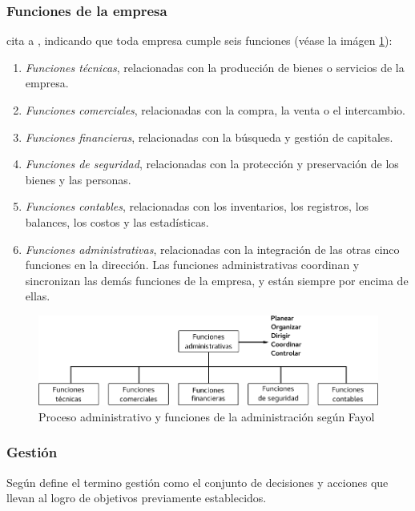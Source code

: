 \subsubsection{Funciones de la empresa}
\cite{chiavenato} cita a \cite{fayol}, indicando que toda empresa cumple seis funciones
(v\'ease la im\'agen \ref{fig:adm}):
\begin{enumerate}
    \item \emph{Funciones t\'ecnicas}, relacionadas con la producci\'on de bienes o
          servicios de la empresa.
    \item \emph{Funciones comerciales}, relacionadas con la compra, la venta o el
          intercambio.
    \item \emph{Funciones financieras}, relacionadas con la b\'usqueda y gesti\'on
          de capitales.
    \item \emph{Funciones de seguridad}, relacionadas con la protecci\'on y preservaci\'on
          de los bienes y las personas.
    \item \emph{Funciones contables}, relacionadas con los inventarios, los registros,
          los balances, los costos y las estad\'isticas.
    \item \emph{Funciones administrativas}, relacionadas con la integraci\'on de las
          otras cinco funciones en la direcci\'on. Las funciones administrativas
          coordinan y sincronizan las dem\'as funciones de la empresa, y est\'an siempre
          por encima de ellas.
\end{enumerate}

\begin{figure}[h]
    \centering
    \captionsetup{justification=centering}
    \includegraphics[width=1.0\textwidth]{Imagenes/Bitmap/funciones_adm}
    \caption{Proceso administrativo y funciones de la administraci\'on seg\'un Fayol}
    \label{fig:adm}
\end{figure}

\subsubsection{Gesti\'on}
Seg\'un \cite{beltran} define el termino gesti\'on como el conjunto de decisiones
y acciones que llevan al logro de objetivos previamente establecidos.

